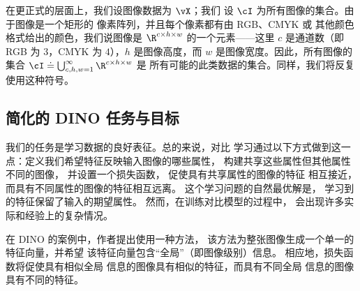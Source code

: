 \documentclass[../../book-main_zh.tex]{subfiles}
\begin{document}
在更正式的层面上，我们设图像数据为 \(\vX\)；我们
设 \(\cI\) 为所有图像的集合。由于图像是一个矩形的
像素阵列，并且每个像素都有由 RGB、CMYK 或
其他颜色格式给出的颜色，我们说图像是 \(\R^{c
\times h \times w}\) 的一个元素——这里 \(c\) 是通道数（即
RGB 为 \(3\)，CMYK 为 \(4\)），\(h\) 是图像高度，而
\(w\) 是图像宽度。因此，所有图像的集合 \(\cI
\doteq \bigcup_{c, h, w = 1}^{\infty}\R^{c \times h \times w}\) 是
所有可能的此类数据的集合。同样，我们将反复使用这种符号。

\subsection{简化的 DINO 任务与目标}
\label{sub:contrastive_learning_objective}

我们的任务是学习数据的良好表征。总的来说，对比
学习通过以下方式做到这一点：定义我们希望特征反映输入图像的哪些属性，
构建共享这些属性但其他属性不同的图像，
并设置一个损失函数，
促使具有共享属性的图像的特征
相互接近，而具有不同属性的图像的特征相互远离。
这个学习问题的自然最优解是，
学习到的特征保留了输入的期望属性。
然而，在训练对比模型的过程中，
会出现许多实际和经验上的复杂情况。

在 DINO 的案例中，作者提出使用一种方法，
该方法为整张图像生成一个单一的特征向量，并希望
该特征向量包含“全局”（即图像级别）信息。
相应地，损失函数将促使具有相似全局
信息的图像具有相似的特征，而具有不同全局
信息的图像具有不同的特征。
\end{document}
